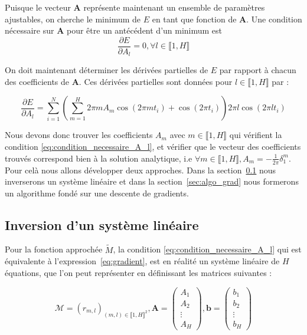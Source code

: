 \documentclass[12pt]{report}
\begin{document}
Puisque le vecteur $\bm{A}$ représente maintenant un ensemble de paramètres ajustables, on cherche le minimum de $E$ en tant que fonction de $\bm{A}$.
Une condition nécessaire sur $\bm{A}$ pour être un antécédent d'un minimum est
\begin{equation}
    \frac{\partial E}{\partial A_l} = 0, {\forall l \in\llbracket 1,H \rrbracket}
    \label{eq:condition_necessaire_A_l}
\end{equation}

On doit maintenant déterminer les dérivées partielles de $E$ par rapport à chacun des coefficients de $\bm{A}$.
Ces dérivées partielles sont données pour $l \in \llbracket 1,H \rrbracket$ par :

\begin{equation}
    \frac{\partial E}{\partial A_l} =
    \sum_{i=1}^{N}(\sum_{m=1}^{H} 2\pi m A_m \cos(2\pi m t_i)+\cos(2\pi t_i))
    2\pi l \cos(2\pi l t_i)
    \label{eq:gradient}
\end{equation}

Nous devons donc trouver les coefficients $A_m$ avec ${m\in \llbracket 1,H \rrbracket}$ qui vérifient la condition \ref{eq:condition_necessaire_A_l}, et vérifier que le vecteur des coefficients trouvés correspond bien à la solution analytique, i.e $\forall m \in\llbracket 1,H \rrbracket, A_m = -\frac{1}{2\pi}\delta_1^m$.
Pour celà nous allons développer deux approches.
Dans la section~\ref{sec:inversion_sys_lin} nous inverserons un système linéaire et dans la section~\ref{sec:algo_grad} nous formerons un algorithme fondé sur une descente de gradients.

\subsection{Inversion d'un système linéaire}
\label{sec:inversion_sys_lin}

Pour la fonction approchée $\tilde{M}$, la condition \ref{eq:condition_necessaire_A_l} qui est équivalente à l'expression~\ref{eq:gradient}, est en réalité un système linéaire de $H$ équations, que l'on peut représenter en définissant les matrices suivantes :

\begin{equation}
    \mathcal{M} = (r_{m,l})_{(m,l)\in \llbracket 1, H\rrbracket ^2},
    \bm{A} = \begin{pmatrix}
        A_1    \\
        A_2    \\
        \vdots \\
        A_H
    \end{pmatrix},
    \bm{b} = \begin{pmatrix}
        b_1    \\
        b_2    \\
        \vdots \\
        b_H
    \end{pmatrix}
    \label{eq:definition_notation}
\end{equation}
\end{document}
